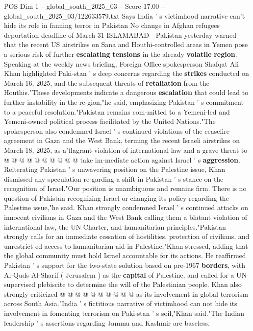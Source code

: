 \begin{textsample}{POS Dim 1 – global\_south\_2025\_03 – Score 17.00 – global\_south\_2025\_03/122633579.txt}  \label{ex:f1_pos_295}
Says India ' s victimhood narrative can't hide its role in fanning terror in Pakistan No change in Afghan refugees deportation deadline of March 31 ISLAMABAD - Pakistan yesterday warned that the recent US airstrikes on Sana and Houthi-controlled areas in Yemen pose a serious risk of further \textbf{escalating} \textbf{tensions} in the already \textbf{volatile} \textbf{region}.
Speaking at the weekly news briefing, Foreign Office spokesperson Shafqat Ali Khan highlighted Paki-stan ' s deep concerns regarding the \textbf{strikes} conducted on March 16, 2025, and the subsequent threats of \textbf{retaliation} from the Houthis."These developments indicate a dangerous \textbf{escalation} that could lead to further instability in the re-gion,"he said, emphasizing Pakistan ' s commitment to a peaceful resolution."Pakistan remains com-mitted to a Yemeni-led and Yemeni-owned political process facilitated by the United Nations."The spokesperson also condemned Israel ' s continued violations of the ceasefire agreement in Gaza and the West Bank, terming the recent Israeli airstrikes on March 18, 2025, as a"flagrant violation of international law and a grave threat to @ @ @ @ @ @ @ @ @ @ take im-mediate action against Israel ' s \textbf{aggression}.
Reiterating Pakistan ' s unwavering position on the Palestine issue, Khan dismissed any speculation re-garding a shift in Pakistan ' s stance on the recognition of Israel."Our position is unambiguous and remains firm.
There is no question of Pakistan recognizing Israel or changing its policy regarding the Palestine issue,"he said.
Khan strongly condemned Israel ' s continued attacks on innocent civilians in Gaza and the West Bank calling them a blatant violation of international law, the UN Charter, and humanitarian principles."Pakistan strongly calls for an immediate cessation of hostilities, protection of civilians, and unrestrict-ed access to humanitarian aid in Palestine,"Khan stressed, adding that the global community must hold Israel accountable for its actions.
He reaffirmed Pakistan ' s support for the two-state solution based on pre-1967 \textbf{borders}, with Al-Quds Al-Sharif ( Jerusalem ) as the \textbf{capital} of Palestine, and called for a UN-supervised plebiscite to determine the will of the Palestinian people.
Khan also strongly criticized @ @ @ @ @ @ @ @ @ @ as its involvement in global terrorism across South Asia."India ' s fictitious narrative of victimhood can not hide its involvement in fomenting terrorism on Paki-stan ' s soil,"Khan said."The Indian leadership ' s assertions regarding Jammu and Kashmir are baseless.

\end{textsample}
